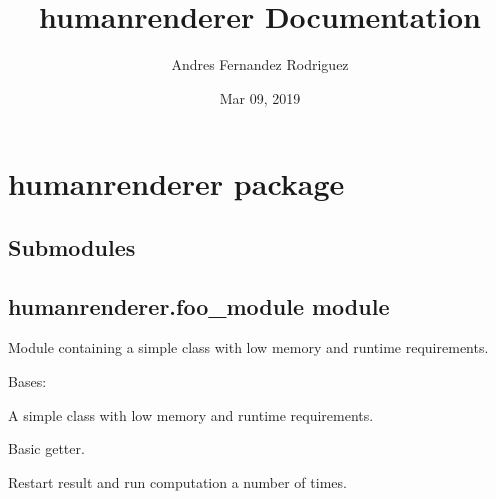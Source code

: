 \documentclass[letterpaper,10pt,english,openany,oneside]{sphinxmanual}
\title{humanrenderer Documentation}
\date{Mar 09, 2019}
\author{Andres Fernandez Rodriguez}
\begin{document}
\pagestyle{empty}
\maketitle
\pagestyle{plain}
\sphinxtableofcontents
\pagestyle{normal}
\label{\detokenize{index::doc}}



\chapter{humanrenderer package}
\label{\detokenize{humanrenderer:humanrenderer-package}}\label{\detokenize{humanrenderer::doc}}

\section{Submodules}
\label{\detokenize{humanrenderer:submodules}}

\section{humanrenderer.foo\_module module}
\label{\detokenize{humanrenderer:module-humanrenderer.foo_module}}\label{\detokenize{humanrenderer:humanrenderer-foo-module-module}}
Module containing a simple class with low memory and runtime requirements.

\begin{fulllineitems}
\label{\detokenize{humanrenderer:humanrenderer.foo_module.Foo}}
Bases: 

A simple class with low memory and runtime requirements.

\begin{fulllineitems}
\label{\detokenize{humanrenderer:humanrenderer.foo_module.Foo.get_result}}
Basic getter.

\end{fulllineitems}


\begin{fulllineitems}
\label{\detokenize{humanrenderer:humanrenderer.foo_module.Foo.loop}}
Restart result and run computation a number of times.

\end{fulllineitems}


\end{fulllineitems}
\end{document}
